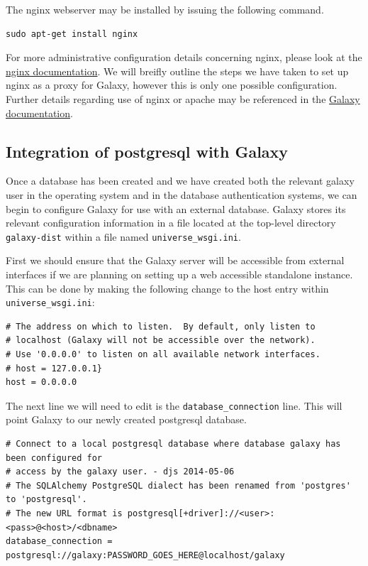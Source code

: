 \documentclass[a4paper,10pt]{article}
\begin{document}
The nginx webserver may be installed by issuing the following command.

\begin{lstlisting}
sudo apt-get install nginx
\end{lstlisting}

For more administrative configuration details concerning nginx, please look at the \href{http://nginx.org/en/docs/}{nginx documentation}.  We will breifly outline the steps we have taken to set up nginx as a proxy for Galaxy, however this is only one possible configuration.  Further details regarding use of nginx or apache may be referenced in the \href{https://wiki.galaxyproject.org/Admin/Config/Performance/ProductionServer}{Galaxy documentation}.

\subsection{Integration of postgresql with Galaxy}
Once a database has been created and we have created both the relevant galaxy user in the operating system and in the database authentication systems, we can begin to configure Galaxy for use with an external database.
Galaxy stores its relevant configuration information in a file located at the top-level directory \texttt{\footnotesize{galaxy-dist}} within a file named \texttt{\footnotesize{universe\_wsgi.ini}}.

First we should ensure that the Galaxy server will be accessible from external interfaces if we are planning on setting up a web accessible standalone instance.  This can be done by making the following change to the host entry within \texttt{\footnotesize{universe\_wsgi.ini}}:

\begin{lstlisting}
# The address on which to listen.  By default, only listen to
# localhost (Galaxy will not be accessible over the network).
# Use '0.0.0.0' to listen on all available network interfaces.
# host = 127.0.0.1}
host = 0.0.0.0
\end{lstlisting}

The next line we will need to edit is the \texttt{\footnotesize{database\_connection}} line.  This will point Galaxy to our newly created postgresql database.

\begin{lstlisting}
# Connect to a local postgresql database where database galaxy has been configured for
# access by the galaxy user. - djs 2014-05-06
# The SQLAlchemy PostgreSQL dialect has been renamed from 'postgres' to 'postgresql'.
# The new URL format is postgresql[+driver]://<user>:<pass>@<host>/<dbname>
database_connection = postgresql://galaxy:PASSWORD_GOES_HERE@localhost/galaxy
\end{lstlisting}
\end{document}
